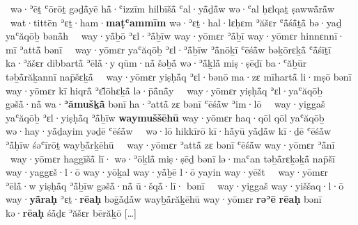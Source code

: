 \begin{Parallel}{0.425\textwidth}{0.545\textwidth}
{	~wə·ʾēṯ ʿōrōṯ gəḏå̄yē hå̄·ʿizzīm hilbīšå̄ ʿal·yå̄ḏå̄w wə·ʿal ḥɛlqaṯ ṣawwå̄rå̄w\ %
	~wat·tittēn ʾɛṯ·ham·\textbf{maṭʿammīm} wə·ʾɛṯ·hal·lɛḥɛm ʾăšɛr ʿå̄śå̄ṯå̄ bə·yaḏ yaʿăqōḇ bənå̄h\ %
	~way·yå̄ḇō ʾɛl·ʾå̄ḇīw way·yōmɛr ʾå̄ḇī way·yōmɛr hinnɛnnī· mī ʾattå̄ bənī\ %
	~way·yōmɛr yaʿăqōḇ ʾɛl·ʾå̄ḇīw ʾå̄nōḵī ʿēśå̄w bəḵōrɛḵå̄ ʿå̄śīṯī ka·ʾăšɛr dibbartå̄ ʾēlå̄·y qūm·nå̄ šəḇå̄ wə·ʾå̄ḵlå̄ miṣ·ṣēḏī ba·ʿăḇūr təḇå̄răḵannī nap̄šɛḵå̄\ %
	~way·yōmɛr yiṣḥå̄q ʾɛl·bənō ma·zɛ mīhartå̄ li·mṣō bənī way·yōmɛr kī hiqrå̄ {\YHWH} ʾɛ̆lōhɛḵå̄ lə·p̄å̄nå̄y\ %
	~way·yōmɛr yiṣḥå̄q ʾɛl·yaʿăqōḇ gəšå̄·nå̄ wa·\textbf{ʾămušḵå̄} bənī ha·ʾattå̄ zɛ bənī ʿēśå̄w ʾim·lō\ %
	~way·yiggaš yaʿăqōḇ ʾɛl·yiṣḥå̄q ʾå̄ḇīw \textbf{waymuššēhū} way·yōmɛr haq·qōl qōl yaʿăqōḇ wə·hay·yå̄ḏayim yəḏē ʿēśå̄w\ %
	~wə·lō hikkīrō kī·hå̄yū yå̄ḏå̄w kī·ḏē ʿēśå̄w ʾå̄ḥīw śəʿīrōṯ wayḇå̄rḵēhū\ %
	~way·yōmɛr ʾattå̄ zɛ bənī ʿēśå̄w way·yōmɛr ʾå̄nī\ %
	~way·yōmɛr haggīšå̄ lī· wə·ʾōḵlå̄ miṣ·ṣēḏ bənī lə·maʿan təḇå̄rɛḵəḵå̄ nap̄šī way·yaggɛš·l·ō way·yōḵal way·yå̄ḇē l·ō yayin way·yēšt\ %
	~way·yōmɛr ʾēlå̄·w yiṣḥå̄q ʾå̄ḇīw gəšå̄·nå̄ ū·šqå̄·lī· bənī\ %
	~way·yiggaš way·yiššaq·l·ō way·\textbf{yå̄raḥ} ʾɛṯ·\textbf{rēaḥ} bəḡå̄ḏå̄w wayḇå̄răḵēhū way·yōmɛr \textbf{rəʾē} \textbf{rēaḥ} bənī kə·\textbf{rēaḥ} śå̄ḏɛ ʾăšɛr bērăḵō {\YHWH}
	[…]
}
\end{Parallel}
